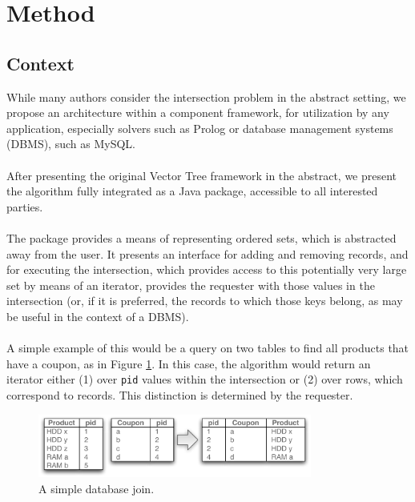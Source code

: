 \documentclass[11pt,letterpaper]{article}
\begin{document}

\section{Method}

\subsection{Context}
While many authors consider the intersection problem in the abstract setting,
we propose an architecture within a component framework, for utilization by
any application, especially solvers such as Prolog or database management
systems (DBMS), such as MySQL.

\paragraph{}
After presenting the original Vector Tree framework in the abstract, we present 
the algorithm fully integrated as a Java package, accessible to all interested parties.

\paragraph{}
The package provides a means of representing ordered sets, which is abstracted
away from the user.  It presents an interface for adding and removing records,
and for executing the intersection, which provides access to this potentially very
large set by means of an iterator, provides the requester with those values in the
intersection (or, if it is preferred, the records to which those keys belong, as may
be useful in the context of a DBMS).

\paragraph{}
A simple example of this would be a query on two tables to find all products that
have a coupon, as in Figure \ref{fig:db-join}. In this case, the algorithm would return
an iterator either (1) over {\tt pid} values within the intersection or (2) over rows,
which correspond to records.  This distinction is determined by the requester.

\begin{figure}[t]
\center
\includegraphics[width=90mm]{db-join.pdf}
\caption{A simple database join.}
\label{fig:db-join}
\end{figure}
\end{document}
